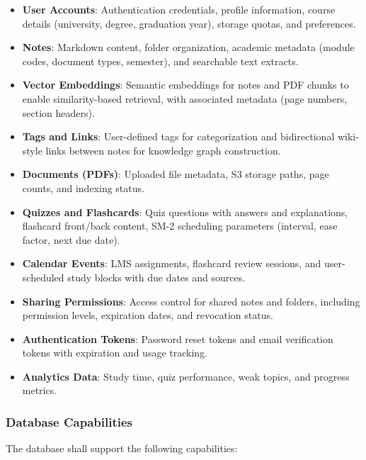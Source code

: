 \documentclass[12pt,a4paper]{article}
\begin{document}
\begin{itemize}
    \item \textbf{User Accounts}: Authentication credentials, profile information, course details (university, degree, graduation year), storage quotas, and preferences.
    \item \textbf{Notes}: Markdown content, folder organization, academic metadata (module codes, document types, semester), and searchable text extracts.
    \item \textbf{Vector Embeddings}: Semantic embeddings for notes and PDF chunks to enable similarity-based retrieval, with associated metadata (page numbers, section headers).
    \item \textbf{Tags and Links}: User-defined tags for categorization and bidirectional wiki-style links between notes for knowledge graph construction.
    \item \textbf{Documents (PDFs)}: Uploaded file metadata, S3 storage paths, page counts, and indexing status.
    \item \textbf{Quizzes and Flashcards}: Quiz questions with answers and explanations, flashcard front/back content, SM-2 scheduling parameters (interval, ease factor, next due date).
    \item \textbf{Calendar Events}: LMS assignments, flashcard review sessions, and user-scheduled study blocks with due dates and sources.
    \item \textbf{Sharing Permissions}: Access control for shared notes and folders, including permission levels, expiration dates, and revocation status.
    \item \textbf{Authentication Tokens}: Password reset tokens and email verification tokens with expiration and usage tracking.
    \item \textbf{Analytics Data}: Study time, quiz performance, weak topics, and progress metrics.
\end{itemize}

\subsubsection{Database Capabilities}

The database shall support the following capabilities:
\end{document}
